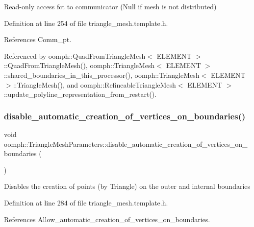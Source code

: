 Read-\/only access fct to communicator (Null if mesh is not distributed) 



Definition at line 254 of file triangle\+\_\+mesh.\+template.\+h.



References Comm\+\_\+pt.



Referenced by oomph\+::\+Quad\+From\+Triangle\+Mesh$<$ E\+L\+E\+M\+E\+N\+T $>$\+::\+Quad\+From\+Triangle\+Mesh(), oomph\+::\+Triangle\+Mesh$<$ E\+L\+E\+M\+E\+N\+T $>$\+::shared\+\_\+boundaries\+\_\+in\+\_\+this\+\_\+processor(), oomph\+::\+Triangle\+Mesh$<$ E\+L\+E\+M\+E\+N\+T $>$\+::\+Triangle\+Mesh(), and oomph\+::\+Refineable\+Triangle\+Mesh$<$ E\+L\+E\+M\+E\+N\+T $>$\+::update\+\_\+polyline\+\_\+representation\+\_\+from\+\_\+restart().

\mbox{\label{classoomph_1_1TriangleMeshParameters_a5b233318ec4e4635d7b74c27d0c6287c}} 
\subsubsection{\texorpdfstring{disable\+\_\+automatic\+\_\+creation\+\_\+of\+\_\+vertices\+\_\+on\+\_\+boundaries()}{disable\_automatic\_creation\_of\_vertices\_on\_boundaries()}}
{\footnotesize\ttfamily void oomph\+::\+Triangle\+Mesh\+Parameters\+::disable\+\_\+automatic\+\_\+creation\+\_\+of\+\_\+vertices\+\_\+on\+\_\+boundaries (\begin{DoxyParamCaption}{ }\end{DoxyParamCaption})\hspace{0.3cm}{\ttfamily [inline]}}

Disables the creation of points (by Triangle) on the outer and internal boundaries 

Definition at line 284 of file triangle\+\_\+mesh.\+template.\+h.



References Allow\+\_\+automatic\+\_\+creation\+\_\+of\+\_\+vertices\+\_\+on\+\_\+boundaries.



